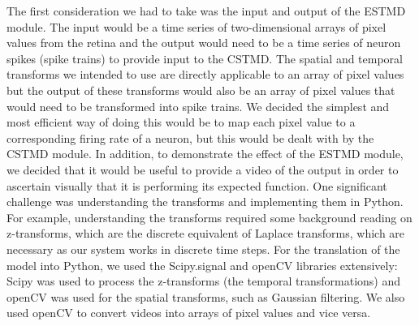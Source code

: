 \documentclass[a4paper,11pt]{article}
\begin{document}
The first consideration we had to take was the input and output of the ESTMD module. The input would be a time series of two-dimensional arrays of pixel values from the retina and the output would need to be a time series of neuron spikes (spike trains) to provide input to the CSTMD. The spatial and temporal transforms we intended to use are directly applicable to an array of pixel values but the output of these transforms would also be an array of pixel values that would need to be transformed into spike trains. We decided the simplest and most efficient way of doing this would be to map each pixel value to a corresponding firing rate of a neuron, but this would be dealt with by the CSTMD module. In addition, to demonstrate the effect of the ESTMD module, we decided that it would be useful to provide a video of the output in order to ascertain visually that it is performing its expected function.
\newline
\newline
One significant challenge was understanding the transforms and implementing them in Python. For example, understanding the transforms required some background reading on z-transforms, which are the discrete equivalent of Laplace transforms, which are necessary as our system works in discrete time steps. For the translation of the model into Python, we used the Scipy.signal and openCV \cite{opencv} libraries extensively: Scipy was used to process the z-transforms (the temporal transformations) and openCV was used for the spatial transforms, such as Gaussian filtering. We also used openCV to convert videos into arrays of pixel values and vice versa.
\end{document}
